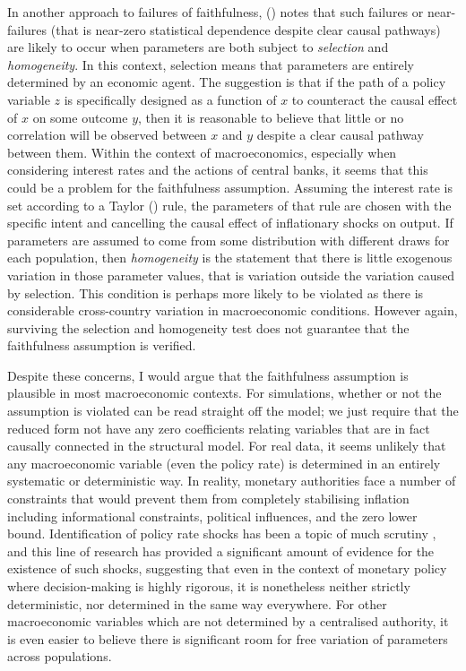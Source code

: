 \documentclass{article}
\begin{document}
In another approach to failures of faithfulness, \citeauthor{steel2006homogeneity} (\citeyear{steel2006homogeneity}) notes that such failures or near-failures (that is near-zero statistical dependence despite clear causal pathways) are likely to occur when parameters are both subject to \textit{selection} and \textit{homogeneity}. In this context, selection means that parameters are entirely determined by an economic agent. The suggestion is that if the path of a policy variable $z$ is specifically designed as a function of $x$ to counteract the causal effect of $x$ on some outcome $y$, then it is reasonable to believe that little or no correlation will be observed between $x$ and $y$ despite a clear causal pathway between them. Within the context of macroeconomics, especially when considering interest rates and the actions of central banks, it seems that this could be a problem for the faithfulness assumption. Assuming the interest rate is set according to a Taylor (\citeyear{taylor1993discretion}) rule, the parameters of that rule are chosen with the specific intent and cancelling the causal effect of inflationary shocks on output. If parameters are assumed to come from some distribution with different draws for each population, then \textit{homogeneity} is the statement that there is little exogenous variation in those parameter values, that is variation outside the variation caused by selection. This condition is perhaps more likely to be violated as there is considerable cross-country variation in macroeconomic conditions. However again, surviving the selection and homogeneity test does not guarantee that the faithfulness assumption is verified.

Despite these concerns, I would argue that the faithfulness assumption is plausible in most macroeconomic contexts. For simulations, whether or not the assumption is violated can be read straight off the model; we just require that the reduced form not have any zero coefficients relating variables that are in fact causally connected in the structural model. For real data, it seems unlikely that any macroeconomic variable (even the policy rate) is determined in an entirely systematic or deterministic way. In reality, monetary authorities face a number of constraints that would prevent them from completely stabilising inflation including informational constraints, political influences, and the zero lower bound. Identification of policy rate shocks has been a topic of much scrutiny \parencite{ramey2016handbook}, and this line of research has provided a significant amount of evidence for the existence of such shocks, suggesting that even in the context of monetary policy where decision-making is highly rigorous, it is nonetheless neither strictly deterministic, nor determined in the same way everywhere. For other macroeconomic variables which are not determined by a centralised authority, it is even easier to believe there is significant room for free variation of parameters across populations.
\end{document}
